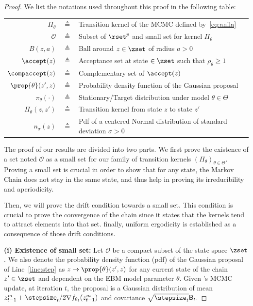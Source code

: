 \documentclass{article} %
\begin{document}
\begin{proof}



We list the notations used throughout this proof in the following table:

\begin{table}[htbp]
\begin{tabular}{r c p{17cm} }
\toprule
$\Pi_\theta$ & $\triangleq$ &  Transition kernel of the MCMC defined by~\eqref{eq:anila}\\
$\mathcal{O}$ & $\triangleq$ & Subset of $\rset^p$ and small set for kernel $\Pi_\theta$\\
$B(z,a)$  & $\triangleq$ & Ball around $z \in \zset$ of radius $a >0$\\
$\accept(z)$ & $\triangleq$ & Acceptance set at state $ \in \zset$ such that $\rho_\theta \geq 1$ \\
$\compaccept(z)$ & $\triangleq$ & Complementary set of  $\accept(z)$\\
$\prop{\theta}(z',z)$ & $\triangleq$ &  Probability density function of the Gaussian proposal\\
$\pi_{\theta}(\cdot)$ & $\triangleq$ &  Stationary/Target distribution under model $\theta \in \Theta$\\
$\Pi_\theta(z, z')$ & $\triangleq$ & Transition kernel from state $z$ to state $z'$\\
$n_{\sigma}(z)$ & $\triangleq$ & Pdf of a centered Normal distribution of standard deviation $\sigma >0$ \\
\bottomrule
\end{tabular}
\label{tab:notations}
\end{table}

The proof of our results are divided into two parts.
We first prove the existence of a set noted $\mathcal{O}$ as a small set for our family of transition kernels $(\Pi_\theta)_{\theta \in \Theta}$.
Proving a small set is crucial in order to show that for any state, the Markov Chain does not stay in the same state, and thus help in proving its irreducibility and aperiodicity.

Then, we will prove the drift condition towards a small set.
This condition is crucial to prove the convergence of the chain since it states that the kernels tend to attract elements into that set. 
finally, uniform ergodicity is established as a consequence of those drift conditions.

\medskip
\noindent \textbf{(i) Existence of small set: }
Let $\mathcal{O}$ be a compact subset of the state space $\zset$.
We also denote the probability density function (pdf) of the Gaussian proposal of Line~\ref{line:step} as $z \to \prop{\theta}(z',z)$ for any current state of the chain $z' \in \zset$ and dependent on the EBM model parameter $\theta$.
Given \algo's MCMC update, at iteration $t$, the proposal is a Gaussian distribution of mean $z_{t-1}^m+ \stepsize_t/2  \nabla f_{\theta_t}(z_{t-1}^m)$ and covariance $\sqrt{\stepsize_t} \mathsf{B}_t$.


\end{proof}
\end{document}
